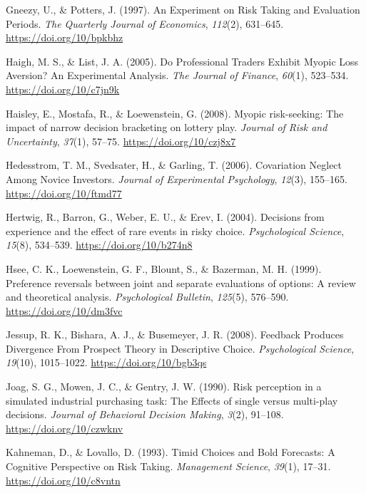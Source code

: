 \documentclass[
  english,
  man, donotrepeattitle,floatsintext]{apa7}
\newlength{\cslhangindent}
\newenvironment{cslreferences}%
  {\setlength{\parindent}{0pt}%
  \everypar{\setlength{\hangindent}{\cslhangindent}}\ignorespaces}%
  {\par}
\theoremstyle{definition}
\theoremstyle{definition}
\theoremstyle{definition}
\theoremstyle{definition}
\theoremstyle{remark}
\begin{document}
\begin{cslreferences}
\leavevmode\hypertarget{ref-gneezy1997}{}%
Gneezy, U., \& Potters, J. (1997). An Experiment on Risk Taking and Evaluation Periods. \emph{The Quarterly Journal of Economics}, \emph{112}(2), 631--645. \url{https://doi.org/10/bpkbhz}

\leavevmode\hypertarget{ref-haigh2005}{}%
Haigh, M. S., \& List, J. A. (2005). Do Professional Traders Exhibit Myopic Loss Aversion? An Experimental Analysis. \emph{The Journal of Finance}, \emph{60}(1), 523--534. \url{https://doi.org/10/c7jn9k}

\leavevmode\hypertarget{ref-haisley2008}{}%
Haisley, E., Mostafa, R., \& Loewenstein, G. (2008). Myopic risk-seeking: The impact of narrow decision bracketing on lottery play. \emph{Journal of Risk and Uncertainty}, \emph{37}(1), 57--75. \url{https://doi.org/10/czj8x7}

\leavevmode\hypertarget{ref-hedesstrom2006}{}%
Hedesstrom, T. M., Svedsater, H., \& Garling, T. (2006). Covariation Neglect Among Novice Investors. \emph{Journal of Experimental Psychology}, \emph{12}(3), 155--165. \url{https://doi.org/10/ftmd77}

\leavevmode\hypertarget{ref-hertwig2004}{}%
Hertwig, R., Barron, G., Weber, E. U., \& Erev, I. (2004). Decisions from experience and the effect of rare events in risky choice. \emph{Psychological Science}, \emph{15}(8), 534--539. \url{https://doi.org/10/b274n8}

\leavevmode\hypertarget{ref-hsee1999}{}%
Hsee, C. K., Loewenstein, G. F., Blount, S., \& Bazerman, M. H. (1999). Preference reversals between joint and separate evaluations of options: A review and theoretical analysis. \emph{Psychological Bulletin}, \emph{125}(5), 576--590. \url{https://doi.org/10/dm3fvc}

\leavevmode\hypertarget{ref-jessup2008}{}%
Jessup, R. K., Bishara, A. J., \& Busemeyer, J. R. (2008). Feedback Produces Divergence From Prospect Theory in Descriptive Choice. \emph{Psychological Science}, \emph{19}(10), 1015--1022. \url{https://doi.org/10/bgb3qs}

\leavevmode\hypertarget{ref-joag1990}{}%
Joag, S. G., Mowen, J. C., \& Gentry, J. W. (1990). Risk perception in a simulated industrial purchasing task: The Effects of single versus multi-play decisions. \emph{Journal of Behavioral Decision Making}, \emph{3}(2), 91--108. \url{https://doi.org/10/czwknv}

\leavevmode\hypertarget{ref-kahneman1993}{}%
Kahneman, D., \& Lovallo, D. (1993). Timid Choices and Bold Forecasts: A Cognitive Perspective on Risk Taking. \emph{Management Science}, \emph{39}(1), 17--31. \url{https://doi.org/10/c8vntn}


\end{cslreferences}
\end{document}
